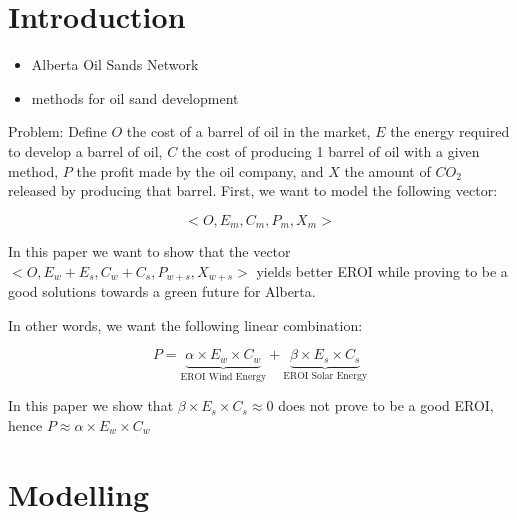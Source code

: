 \documentclass[12pt]{article}
\begin{document}
\maketitle



\tableofcontents

\newpage

\section{Introduction}

\begin{itemize}
\item Alberta Oil Sands Network
\item methods for oil sand development
\end{itemize}

Problem: Define $O$ the cost of a barrel of oil in the market, $E$ the energy required to develop a barrel of oil, $C$ the cost of producing 1 barrel of oil with a given method, $P$ the profit made by the oil company, and $X$ the amount of $CO_2$ released by producing that barrel. First, we want to model the following vector:

\begin{displaymath}
<O, E_m, C_m, P_m, X_m>
\end{displaymath}

In this paper we want to show that the vector $<O, E_{w} + E_{s}, C_{w} + C_{s}, P_{w+s}, X_{w+s}>$ yields better EROI while proving to be a good solutions towards a green future for Alberta. 

In other words, we want the following linear combination:

\begin{displaymath}
P = \underbrace{\alpha \times E_w \times C_w}_\text{EROI Wind Energy} + \underbrace{ \beta \times E_s \times C_s}_\text{EROI Solar Energy}
\end{displaymath}

In this paper we show that $\beta \times E_s \times C_s \approx 0$ does not prove to be a good EROI, hence $P \approx \alpha \times E_w \times C_w $\\


\section{Modelling}
\end{document}
